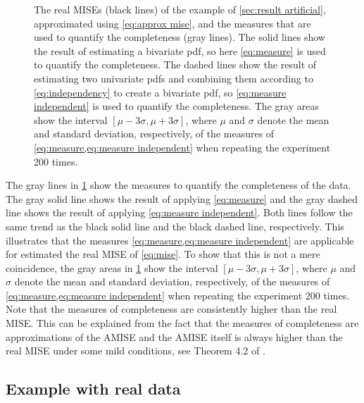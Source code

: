 \setlength\figurewidth{\linewidth}
\setlength{}
\begin{figure}
	\centering
	
	\caption{The real MISEs (black lines) of the example of \cref{sec:result artificial}, approximated using \cref{eq:approx mise}, and the measures that are used to quantify the completeness (gray lines). The solid lines show the result of estimating a bivariate pdf, so here \cref{eq:measure} is used to quantify the completeness. The dashed lines show the result of estimating two univariate pdfs and combining them according to \cref{eq:independency} to create a bivariate pdf, so \cref{eq:measure independent} is used to quantify the completeness. The gray areas show the interval $[\mu-3\sigma,\mu+3\sigma]$, where $\mu$ and $\sigma$ denote the mean and standard deviation, respectively, of the measures of \cref{eq:measure,eq:measure independent} when repeating the experiment 200 times.} 
	\label{fig:mise example}
\end{figure}

The gray lines in \cref{fig:mise example} show the measures to quantify the completeness of the data. The gray solid line shows the result of applying \cref{eq:measure} and the gray dashed line shows the result of applying \cref{eq:measure independent}. Both lines follow the same trend as the black solid line and the black dashed line, respectively. This illustrates that the measures \cref{eq:measure,eq:measure independent} are applicable for estimated the real MISE of \cref{eq:mise}. To show that this is not a mere coincidence, the gray areas in \cref{fig:mise example} show the interval $[\mu-3\sigma,\mu+3\sigma]$, where $\mu$ and $\sigma$ denote the mean and standard deviation, respectively, of the measures of \cref{eq:measure,eq:measure independent} when repeating the experiment 200 times. Note that the measures of completeness are consistently higher than the real MISE. This can be explained from the fact that the measures of completeness are approximations of the AMISE and the AMISE itself is always higher than the real MISE under some mild conditions, see Theorem 4.2 of \textcite{marron1992exact}.

\subsection{Example with real data}
\label{sec:result real}

